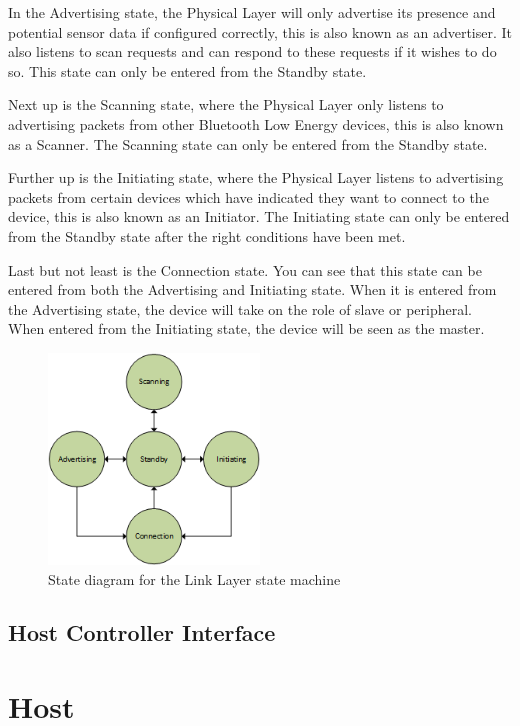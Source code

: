 \documentclass[pdftex,a4paper,12pt,twoside]{report}
\begin{document}
In the Advertising state, the Physical Layer will only advertise its presence and potential sensor data if configured correctly, this is also known as an advertiser. It also listens to scan requests and can respond to these requests if it wishes to do so. This state can only be entered from the Standby state.

Next up is the Scanning state, where the Physical Layer only listens to advertising packets from other Bluetooth Low Energy devices, this is also known as a Scanner. The Scanning state can only be entered from the Standby state.

Further up is the Initiating state, where the Physical Layer listens to advertising packets from certain devices which have indicated they want to connect to the device, this is also known as an Initiator. The Initiating state can only be entered from the Standby state after the right conditions have been met.

Last but not least is the Connection state. You can see that this state can be entered from both the Advertising and Initiating state. When it is entered from the Advertising state, the device will take on the role of slave or peripheral. When entered from the Initiating state, the device will be seen as the master.

\begin{figure}[h]
    \centering
    \includegraphics[width=0.5\textwidth]{img/llstate.png}
    \caption{State diagram for the Link Layer state machine}
    \label{fig:llstatemachine}
\end{figure}

\subsection{Host Controller Interface}
\label{subsec:controllerHCI}

\section{Host}
\label{sec:stackHost}
\end{document}
